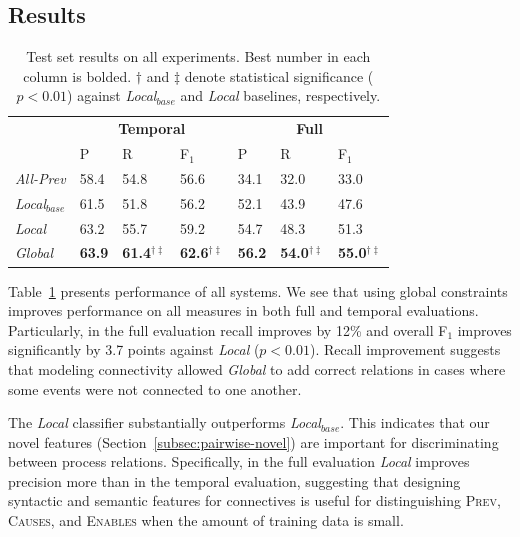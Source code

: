 \subsection{Results} \label{subsec:results}

\begin{table}[t]
\setlength{\tabcolsep}{5pt}
{\footnotesize
\begin{tabular}{  l | l  l  l | l  l  l  }
    & \multicolumn{3}{c|}{\textbf{Temporal}} & \multicolumn{3}{c}{\textbf{Full}} \\
    & P & R & F$_1$ & P & R & F$_1$ \\
\hline
\emph{All-Prev} & 58.4 & 54.8 & 56.6 & 34.1 & 32.0 & 33.0 \\
\emph{Local$_{base}$} & 61.5 & 51.8 & 56.2 &  52.1 & 43.9 & 47.6\\
\emph{Local} & 63.2 & 55.7 & 59.2 & 54.7 & 48.3 & 51.3 \\
\emph{Global} & \textbf{63.9} & \textbf{61.4$^{\dagger\ddagger}$} & \textbf{62.6$^{\dagger\ddagger}$} & \textbf{56.2} & \textbf{54.0$^{\dagger\ddagger}$} & \textbf{55.0$^{\dagger\ddagger}$} 
\end{tabular}}
\caption{Test set results on all experiments. Best number in each column is bolded. $\dagger$ and $\ddagger$ denote statistical significance ($p<0.01$) against \emph{Local$_{base}$} and \emph{Local} baselines, respectively.}
\label{tab:results}
\end{table}

Table~\ref{tab:results} presents performance of all systems. We see that using global constraints improves performance on all measures in both full and temporal evaluations. Particularly, in the full evaluation recall improves by 12\% and overall F$_1$ improves significantly by 3.7 points against \emph{Local} ($p<0.01$). Recall improvement suggests that modeling connectivity allowed \emph{Global} to add correct relations in cases where some events were not connected to one another.

The \emph{Local} classifier substantially outperforms \emph{Local$_{base}$}. This indicates that our novel features (Section~\ref{subsec:pairwise-novel}) are important for discriminating between process relations. Specifically, in the full evaluation \emph{Local} improves precision more than in the temporal evaluation, suggesting that designing syntactic and semantic features for connectives is useful for distinguishing \textsc{Prev}, \textsc{Causes}, and \textsc{Enables} when the amount of training data is small.

